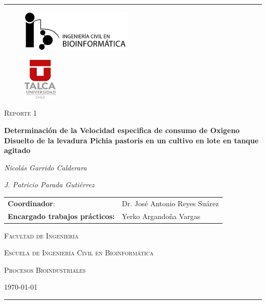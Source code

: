 \documentclass[a4paper,12pt]{article}
\begin{document}
  \begin{titlepage}
    \centering
    \rule[1ex]{\textwidth}{0.8pt}

    \vspace{1cm}
    \begin{minipage}[b]{.45\linewidth}
      \begin{figure}[H]
        \raggedright
        \includegraphics[height=2.0cm]{icb_logo}
      \end{figure}
    \end{minipage}
    \begin{minipage}[b]{.45\linewidth}
      \begin{figure}[H]
        \raggedleft
        \includegraphics[height=2.0cm]{utalca_logo}
      \end{figure}
    \end{minipage}

    \vspace{2cm}

    {\large \scshape Reporte 1 \par}
    \vspace{1cm}
    {\Large \bfseries Determinación de la Velocidad especifica de consumo de Oxigeno Disuelto de la
levadura Pichia pastoris en un cultivo en lote en tanque agitado\par}
    \vspace{2cm}
    {\itshape Nicolás Garrido Calderara \par}
    {\itshape J. Patricio Parada Gutiérrez \par}
    \vspace{2cm}

    \begin{tabular}{ll}
      \textbf{Coordinador}: & Dr. José Antonio Reyes Suárez \\
      \textbf{Encargado trabajos prácticos:} & Yerko Argandoña Vargas \\
    \end{tabular}

    \vfill
    {\scshape Facultad de Ingeniería \par}
    {\scshape Escuela de Ingeniería Civil en Bioinformática \par}
    {\scshape Procesos Bioindustriales \par}

    \vfill
    {\scshape \today \par}

    \vfill
    \rule{\textwidth}{0.8pt}

  \end{titlepage}
\end{document}
